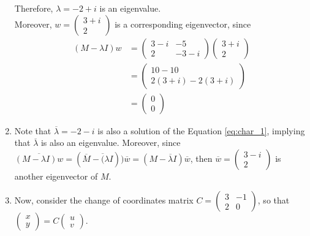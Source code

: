\documentclass[12pt,letterpaper]{article}
\begin{document}
\begin{enumerate}[label=(\alph*)]
	      Therefore, $\lambda = -2 + i$ is an eigenvalue.\vspace{1in}\\
	      Moreover, $w = \begin{pmatrix} 3 + i \\ 2 \end{pmatrix}$
	      is a corresponding eigenvector, since
	      \begin{align*}
		      (M - \lambda I)w & =
		      \begin{pmatrix}
			      3 - i & -5     \\
			      2     & -3 - i
		      \end{pmatrix} \begin{pmatrix} 3 + i \\ 2 \end{pmatrix}\\
		                       & = \begin{pmatrix}
			      10 - 10         \\
			      2(3+i) - 2(3+i)
		      \end{pmatrix}  \\
		                       & = \begin{pmatrix}
			      0 \\0
		      \end{pmatrix}
	      \end{align*}

	\item Note that $\overline{\lambda} = -2 - i$ is also a solution of the Equation \ref{eq:char_1}, implying that $\overline{\lambda}$ is also an eigenvalue. Moreover, since $\overline{(M-\lambda I)w} = (\overline{M} - \overline(\lambda I))\overline{w} = (M - \overline{\lambda} I) \overline{w}$, then $\overline{w} =  \begin{pmatrix}
			      3-i \\
			      2
		      \end{pmatrix}$ is another eigenvector of $M$.

	\item Now, consider the change of coordinates matrix $C = \begin{pmatrix}
			      3 & -1 \\
			      2 & 0
		      \end{pmatrix}$, so that $\begin{pmatrix}
			      x \\
			      y
		      \end{pmatrix} = C \begin{pmatrix}
			      u \\
			      v
		      \end{pmatrix}$.


\end{enumerate}
\end{document}
